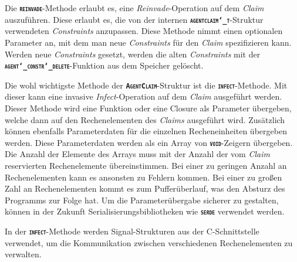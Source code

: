 Die \texttt{\textsc{\textbf{reinvade}}}-Methode erlaubt es, eine \textit{Reinvade}-Operation auf dem
\textit{Claim} auszuführen. Diese erlaubt es, die von der internen
\texttt{\textsc{\textbf{agentclaim\char`_t}}}-Struktur verwendeten \textit{Constraints} anzupassen.
Diese Methode nimmt einen optionalen Parameter an,
mit dem man neue \textit{Constraints} für den \textit{Claim} spezifizieren kann.
Werden neue \textit{Constraints} gesetzt, werden die alten \textit{Constraints} mit der
\texttt{\textsc{\textbf{agent\char`_constr\char`_delete}}}-Funktion aus dem Speicher gelöscht. 

Die wohl wichtigste Methode der \texttt{\textsc{\textbf{AgentClaim}}}-Struktur ist die
\texttt{\textsc{\textbf{infect}}}-Methode. Mit dieser kann eine invasive \textit{Infect}-Operation
auf dem \textit{Claim} ausgeführt werden.
Dieser Methode wird eine Funktion oder eine Closure als Parameter übergeben,
welche dann auf den Rechenelementen des \textit{Claims} ausgeführt wird.
Zusätzlich können ebenfalls Parameterdaten für die einzelnen Recheneinheiten übergeben werden.
Diese Parameterdaten werden als ein Array von \texttt{\textsc{\textbf{void}}}-Zeigern übergeben.
Die Anzahl der Elemente des Arrays muss mit der Anzahl der vom \textit{Claim} reservierten Rechenelemente 
übereinstimmen. Bei einer zu geringen Anzahl an Rechenelementen kann es ansonsten zu Fehlern kommen.
Bei einer zu großen Zahl an Rechenelementen kommt es zum Pufferüberlauf, was den Absturz des Programms zur
Folge hat. Um die Parameterübergabe sicherer zu gestalten, können in der Zukunft Serialisierungsbibliotheken
wie \texttt{\textsc{\textbf{serde}}} verwendet werden.

In der \texttt{\textsc{\textbf{infect}}}-Methode werden Signal-Strukturen aus der C-Schnittstelle verwendet,
um die Kommunikation zwischen verschiedenen Rechenelementen zu verwalten.

